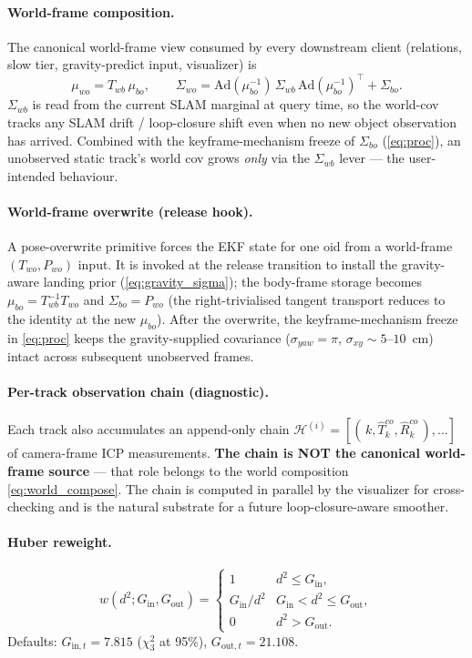 \documentclass[11pt]{article}
\newcommand{\Ad}{\mathrm{Ad}}
\begin{document}
\paragraph{World-frame composition.}\label{sec:world_compose}
The canonical world-frame view consumed by every downstream client
(relations, slow tier, gravity-predict input, visualizer) is
\begin{equation}\label{eq:world_compose}
\mu_{wo} = T_{wb}\,\mu_{bo}, \qquad
\Sigma_{wo} = \Ad(\mu_{bo}^{-1})\,\Sigma_{wb}\,\Ad(\mu_{bo}^{-1})^\top
              + \Sigma_{bo}.
\end{equation}
$\Sigma_{wb}$ is read from the current SLAM marginal at query time, so the
world-cov tracks any SLAM drift / loop-closure shift even when no new
object observation has arrived. Combined with the keyframe-mechanism freeze
of $\Sigma_{bo}$ (\eqref{eq:proc}), an unobserved static track's world cov
grows \emph{only} via the $\Sigma_{wb}$ lever --- the user-intended
behaviour.

\paragraph{World-frame overwrite (release hook).}
A pose-overwrite primitive forces the EKF state for one oid from a
world-frame $(T_{wo},P_{wo})$ input. It is invoked at the release transition
to install the gravity-aware landing prior (\eqref{eq:gravity_sigma}); the
body-frame storage becomes $\mu_{bo}=T_{wb}^{-1}T_{wo}$ and
$\Sigma_{bo}=P_{wo}$ (the right-trivialised tangent transport reduces to the
identity at the new $\mu_{bo}$). After the overwrite, the keyframe-mechanism
freeze in \eqref{eq:proc} keeps the gravity-supplied covariance
($\sigma_{yaw}=\pi$, $\sigma_{xy}\!\sim\!5$--$10$~cm) intact across
subsequent unobserved frames.

\paragraph{Per-track observation chain (diagnostic).}\label{sec:chain}
Each track also accumulates an append-only chain
$\mathcal{H}^{(i)} = [(\,k,\hat T^{co}_k,\hat R^{co}_k\,),\ldots]$ of
camera-frame ICP measurements. \textbf{The chain is NOT the canonical
world-frame source} --- that role belongs to the world composition
\eqref{eq:world_compose}. The chain is computed in parallel by the
visualizer for cross-checking and is the natural substrate for a future
loop-closure-aware smoother.

\paragraph{Huber reweight.}
\begin{equation}\label{eq:huber_w}
w(d^2; G_{\text{in}}, G_{\text{out}}) = \begin{cases}
1 & d^2 \le G_{\text{in}}, \\
G_{\text{in}}/d^2 & G_{\text{in}} < d^2 \le G_{\text{out}}, \\
0 & d^2 > G_{\text{out}}.
\end{cases}
\end{equation}
Defaults: $G_{\text{in},t}=7.815$ ($\chi^2_3$ at 95\%),
$G_{\text{out},t}=21.108$.
\end{document}
